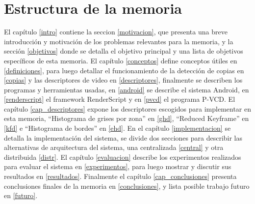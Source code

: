 \section{Estructura de la memoria}
El capítulo \ref{intro} contiene la seccion \ref{motivacion}, que presenta una breve introducción y motivación de los problemas relevantes para la memoria, y la sección \ref{objetivos} donde se detalla el objetivo principal y una lista de objetivos específicos de esta memoria.
El capítulo \ref{conceptos} define conceptos útiles en \ref{definiciones}, para luego detallar el funcionamiento de la detección de copias en \ref{copias} y las descriptores de video en \ref{descriptores}, finalmente se describen los programas y herramientas usadas, en \ref{android} se describe el sistema Android, en \ref{renderscript} el framework RenderScript y en \ref{pvcd} el programa P-VCD.
El capítulo \ref{cap_descriptores} expone los descriptores escogidos para implementar en esta memoria, ``Histograma de grises por zona'' en \ref{ghd}, ``Reduced Keyframe'' en \ref{kfd} e ``Histograma de bordes'' en \ref{ehd}.
En el capítulo \ref{implementacion} se detalla la implementación del sistema, se divide dos secciones para describir las alternativas de arquitectura del sistema, una centralizada \ref{central} y otra distribuida \ref{distr}.
El capítulo \ref{evaluacion} describe los experimentos realizados para evaluar el sistema en \ref{experimentos}, para luego mostrar y discutir sus resultados en \ref{resultados}.
Finalmente el capítulo \ref{cap_conclusiones} presenta conclusiones finales de la memoria en \ref{conclusiones}, y lista posible trabajo futuro en \ref{futuro}.

